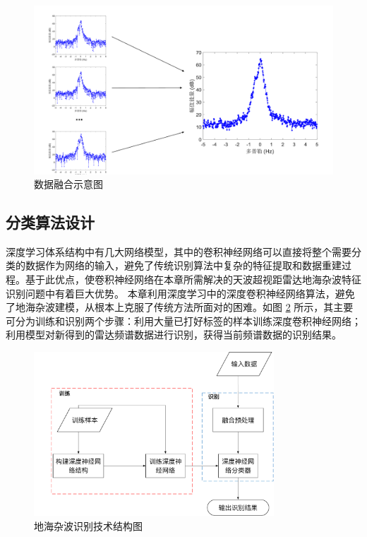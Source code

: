 \begin{figure}[hbt]
	\centering
	\includegraphics[width=13.5cm]{figures/othr/spectrum_fusion}
	\caption{数据融合示意图}
	\label{fig:spectrum_fusion}
\end{figure}

\subsection{分类算法设计}
深度学习体系结构中有几大网络模型，其中的卷积神经网络可以直接将整个需要分类的数据作为网络的输入，避免了传统识别算法中复杂的特征提取和数据重建过程。基于此优点，使卷积神经网络在本章所需解决的天波超视距雷达地海杂波特征识别问题中有着巨大优势。
本章利用深度学习中的深度卷积神经网络算法，避免了地海杂波建模，从根本上克服了传统方法所面对的困难。如图 \ref{fig:othr_tech} 所示，其主要可分为训练和识别两个步骤：利用大量已打好标签的样本训练深度卷积神经网络；利用模型对新得到的雷达频谱数据进行识别，获得当前频谱数据的识别结果。

\begin{figure}[hbt]
	\centering
	\includegraphics[width=9cm]{figures/othr/othr_tech}
	\caption{地海杂波识别技术结构图}
	\label{fig:othr_tech}
\end{figure}

